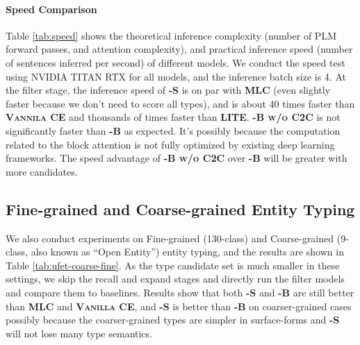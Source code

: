 \paragraph{Speed Comparison} Table \ref{tab:speed} shows the theoretical inference complexity (number of PLM forward passes, and attention complexity), and practical inference speed (number of sentences inferred per second) of different models. We conduct the speed test using NVIDIA TITAN RTX for all models, and the inference batch size is 4.
At the filter stage, the inference speed of {\bf \textsc{\name-S}} is on par with {\bf \textsc{MLC}} (even slightly faster because we don't need to score all types), and is about 40 times faster than {\bf \textsc{Vannila CE}} and thousands of times faster than {\bf \textsc{LITE}}. {\bf \textsc{\name-B w/o C2C}} is not significantly faster than {\bf \textsc{\name-B}} as expected. It's possibly because the computation related to the block attention is not fully optimized by existing deep learning frameworks. The speed advantage of {\bf \textsc{\name-B w/o C2C}} over {\bf \textsc{\name-B}} will be greater with more candidates.


\subsection{Fine-grained and Coarse-grained Entity Typing}
We also conduct experiments on Fine-grained (130-class) and Coarse-grained (9-class, also known as ``Open Entity'') entity typing, and the results are shown in Table \ref{tab:ufet-coarse-fine}. As the type candidate set is much smaller in these settings, we skip the recall and expand stages and directly run the filter models and compare them to baselines. Results show that both {\bf \textsc{\name}-S} and {\bf \textsc{\name}-B} are still better than {\bf \textsc{MLC}} and {\bf \textsc{Vanilla CE}}, and {\bf \textsc{\name}-S} is better than {\bf \textsc{\name}-B} on coarser-grained cases possibly because the coarser-grained types are simpler in surface-forms and {\bf \textsc{\name}-S} will not lose many type semantics.




